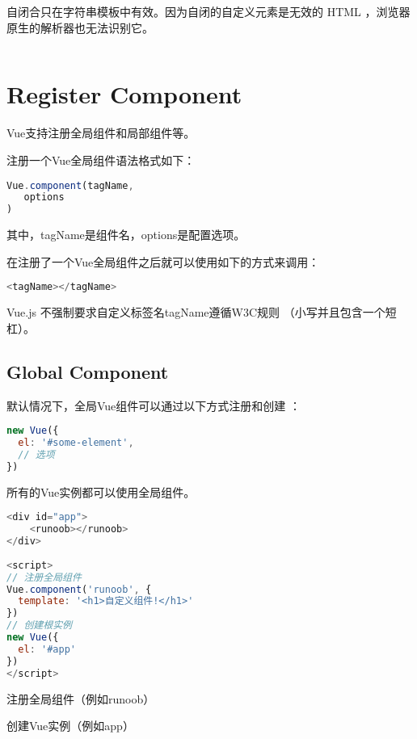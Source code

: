 自闭合只在字符串模板中有效。因为自闭的自定义元素是无效的 HTML ，浏览器原生的解析器也无法识别它。

\begin{lstlisting}[language=JavaScript]

\end{lstlisting}

\section{Register Component}

Vue支持注册全局组件和局部组件等。

注册一个Vue全局组件语法格式如下：




\begin{lstlisting}[language=JavaScript]
Vue.component(tagName,
   options
)
\end{lstlisting}

其中，tagName是组件名，options是配置选项。

在注册了一个Vue全局组件之后就可以使用如下的方式来调用：


\begin{lstlisting}[language=JavaScript]
<tagName></tagName>
\end{lstlisting}

Vue.js 不强制要求自定义标签名tagName遵循W3C规则 （小写并且包含一个短杠）。



\subsection{Global Component}


默认情况下，全局Vue组件可以通过以下方式注册和创建 ：


\begin{lstlisting}[language=JavaScript]
new Vue({
  el: '#some-element',
  // 选项
})
\end{lstlisting}


所有的Vue实例都可以使用全局组件。

\begin{lstlisting}[language=JavaScript]
<div id="app">
    <runoob></runoob>
</div>
 
<script>
// 注册全局组件
Vue.component('runoob', {
  template: '<h1>自定义组件!</h1>'
})
// 创建根实例
new Vue({
  el: '#app'
})
</script>
\end{lstlisting}

\begin{compactenum}
\item 注册全局组件（例如runoob）
\item 创建Vue实例（例如app）
\end{compactenum}










